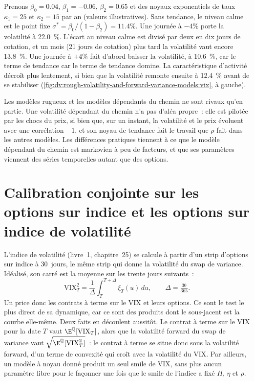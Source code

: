 \begin{example}\label{ex:dv:rough-volatility-and-forward-variance-models:pdv}
Prenons $\beta_0=0.04$, $\beta_1=-0.06$, $\beta_2=0.65$ et des noyaux exponentiels de taux $\kappa_1=25$ et
$\kappa_2=15$ par an (valeurs illustratives). Sans tendance, le niveau calme est le point fixe
$\sigma^*=\beta_0/(1-\beta_2)=11.4\%$. Une journée à $-4\%$ porte la volatilité à 22.0~\%. L'écart au niveau calme est divisé par deux en dix
jours de cotation, et un mois (21 jours de cotation) plus tard la volatilité vaut encore 13.8~\%. Une journée à $+4\%$ fait d'abord baisser la volatilité, à 10.6~\%, car le terme de tendance
car le terme de tendance domine. La caractéristique d'activité décroît plus lentement, si bien que la volatilité remonte ensuite à 12.4~\%
avant de se stabiliser (\cref{fig:dv:rough-volatility-and-forward-variance-models:vix}, à gauche).
\end{example}

Les modèles rugueux et les modèles dépendants du chemin ne sont rivaux qu'en partie. Une volatilité dépendant du chemin n'a pas d'aléa
propre~: elle est pilotée par les chocs du prix, si bien que, sur un instant, la volatilité et le prix évoluent avec une corrélation $-1$,
et son noyau de tendance fait le travail que $\rho$ fait dans les autres modèles. Les différences pratiques tiennent à ce que
le modèle dépendant du chemin est markovien à peu de facteurs, et que ses paramètres viennent des séries temporelles autant
que des options.

\section{Calibration conjointe sur les options sur indice et les options sur indice de volatilité}

L'indice de volatilité (livre~1, chapitre~25) se calcule à partir d'un strip d'options sur indice à 30~jours, le même
strip qui donne la volatilité du swap de variance. Idéalisé, son carré est la  moyenne sur les
trente jours suivants~:
\[
\mathrm{VIX}_T^2=\frac1\Delta\int_T^{T+\Delta}\xi_T(u)\,du,\qquad\Delta=\tfrac{30}{365}.
\]
Un  price donc les contrats à terme sur le VIX et leurs options. Ce sont le test le plus direct de sa
dynamique, car ce sont des produits dont le sous-jacent est la courbe elle-même. Deux faits en découlent aussitôt. Le contrat à terme sur le VIX pour la date
$T$ vaut $\E^{\mathbb Q}[\mathrm{VIX}_T]$, alors que la volatilité forward du swap de variance vaut
$\sqrt{\E^{\mathbb Q}[\mathrm{VIX}_T^2]}$~: le contrat à terme se situe donc sous la volatilité forward, d'un terme de convexité
qui croît avec la volatilité du VIX. Par ailleurs, un modèle à noyau donné produit un seul smile de VIX, sans
plus aucun paramètre libre pour le façonner une fois que le smile de l'indice a fixé $H$, $\eta$ et $\rho$.

